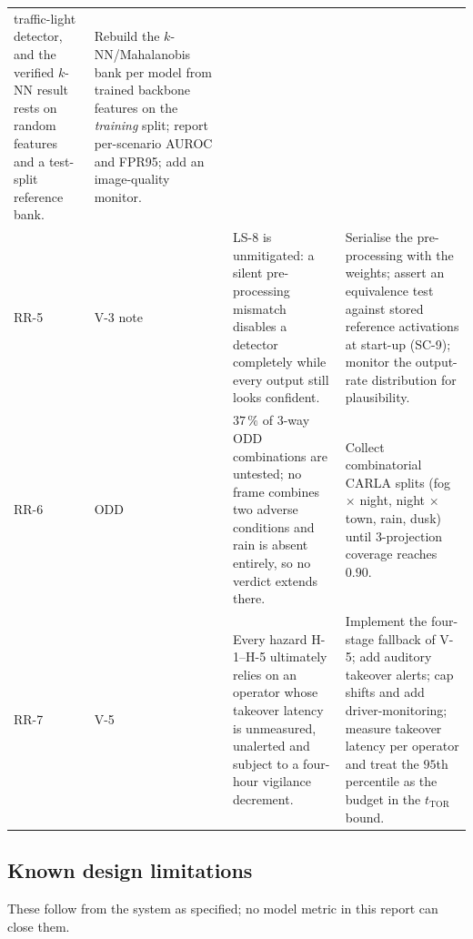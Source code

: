\documentclass[a4paper,12pt]{article}
\begin{document}
{\begin{longtable}{@{}P{0.9cm}P{1.1cm}P{8.2cm}P{4.5cm}@{}}
       traffic-light detector, and the verified $k$-NN result rests on random features and
       a test-split reference bank.
     & Rebuild the $k$-NN/Mahalanobis bank per model from trained backbone features on
       the \emph{training} split; report per-scenario AUROC and FPR95; add an
       image-quality monitor. \\
RR-5 & V-3 note
     & LS-8 is unmitigated: a silent pre-processing mismatch disables a detector
       completely while every output still looks confident.
     & Serialise the pre-processing with the weights; assert an equivalence test
       against stored reference activations at start-up (SC-9); monitor the
       output-rate distribution for plausibility. \\
RR-6 & ODD
     & $37\,\%$ of 3-way ODD combinations are untested; no frame combines two adverse
       conditions and rain is absent entirely, so no verdict extends there.
     & Collect combinatorial CARLA splits (fog $\times$ night, night $\times$ town,
       rain, dusk) until 3-projection coverage reaches $0.90$. \\
RR-7 & V-5
     & Every hazard H-1--H-5 ultimately relies on an operator whose takeover latency is
       unmeasured, unalerted and subject to a four-hour vigilance decrement.
     & Implement the four-stage fallback of V-5; add auditory takeover alerts; cap shifts
       and add driver-monitoring; measure takeover latency per operator and treat the
       $95$th percentile as the budget in the $t_{\text{TOR}}$ bound. \\
\end{longtable}}

\subsection{Known design limitations}

These follow from the system as specified; no model metric in this report can close them.
\end{document}
